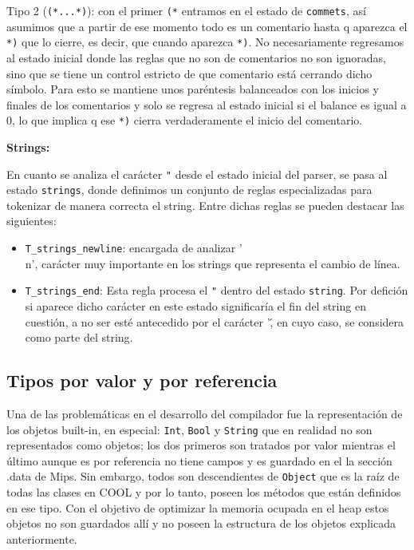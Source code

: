 \documentclass[11pt]{scrartcl} %
\begin{document}
Tipo 2 (\texttt{(*...*)}): con el primer \texttt{(*} entramos en el 
estado de \texttt{commets}, así asumimos que a partir de ese momento todo es un comentario hasta q aparezca el \texttt{*)} que lo cierre, es decir, que cuando aparezca \texttt{*)}. No necesariamente regresamos al estado inicial donde las reglas que no son de comentarios no son ignoradas, sino que se tiene un control estricto de que comentario está cerrando dicho símbolo. Para esto se mantiene unos paréntesis balanceados con los inicios y finales de los comentarios y solo se regresa al estado inicial si el balance es igual a 0, lo que implica q ese \texttt{*)} cierra verdaderamente el inicio del comentario.

\textbf{Strings:}

En cuanto se analiza el carácter \texttt{"} desde el estado inicial del parser, se pasa al estado \texttt{strings}, donde definimos un conjunto de reglas especializadas para tokenizar de manera correcta el string. Entre dichas reglas se pueden destacar las siguientes:

\begin{itemize}
	\item \texttt{T\_strings\_newline}: encargada de analizar '\\n', carácter muy importante en los strings que representa el cambio de línea.
	\item \texttt{T\_strings\_end}: Esta regla procesa el \texttt{"} dentro del estado \texttt{string}. Por defición si aparece dicho carácter en este estado significaría el fin del string en cuestión, a no ser esté antecedido por el carácter '\', en cuyo caso, se considera como parte del string.
	
\end{itemize}

\subsection{Tipos por valor y por referencia}

Una de las problemáticas en el desarrollo del compilador fue la representación de los objetos built-in, en especial: \texttt{Int}, \texttt{Bool} y \texttt{String} que en realidad no son representados como objetos; los dos primeros son tratados por valor mientras el último aunque es por referencia no tiene campos y es guardado en el la sección .data de Mips. Sin embargo, todos son descendientes de \texttt{Object} que es la raíz de todas las clases en COOL y por lo tanto, poseen los métodos que están definidos en ese tipo. Con el objetivo de optimizar la memoria ocupada en el heap estos objetos no son guardados allí y no poseen la estructura de los objetos explicada anteriormente.
\end{document}

